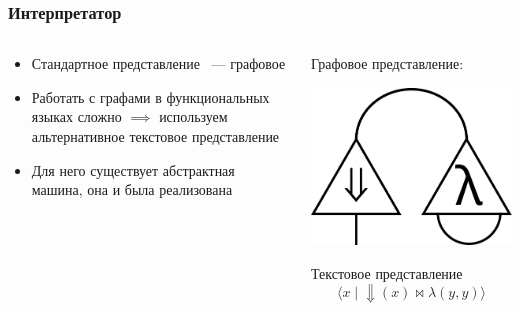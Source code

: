\documentclass
  [ russian
  , aspectratio=169 %
  ] {beamer}
\begin{document}
\begin{frame}
    \frametitle{Интерпретатор \INs{}}

    \begin{columns}
        \begin{column}{0.6\linewidth}
            \begin{itemize}
                \item Стандартное представление \INs{}~--- графовое
                \item Работать с графами в функциональных языках сложно $\implies$ используем альтернативное текстовое представление
                \item Для него существует абстрактная машина, она и была реализована
            \end{itemize}
        \end{column}
        \begin{column}{0.35\linewidth}
            Графовое представление:

            \begin{center}
                \includegraphics[width=0.5\linewidth]{figures/ins_graph.pdf}
            \end{center}

            Текстовое представление
            \[\big\langle x \mid{} \Downarrow(x) \bowtie \lambda(y, y) \big\rangle\]
        \end{column}
    \end{columns}

\end{frame}
\end{document}
